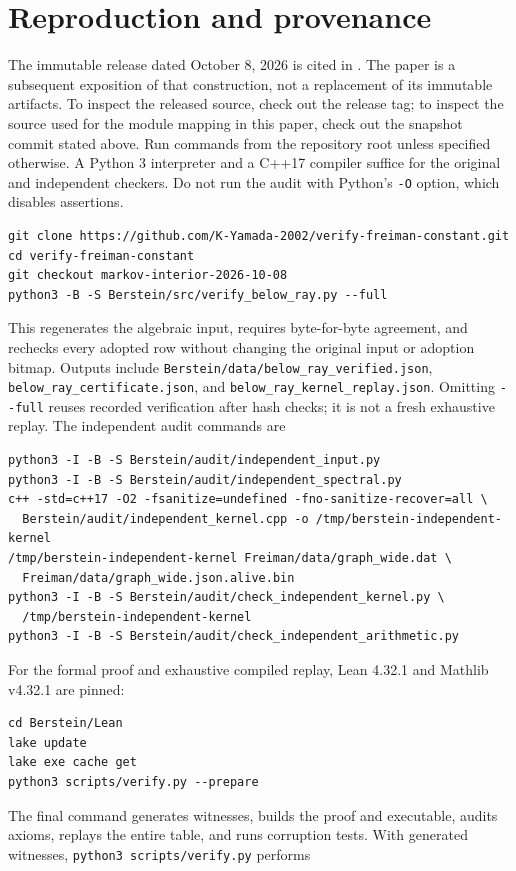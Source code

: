 \documentclass[11pt,a4paper]{article}
\newcommand{\file}[1]{{\normalfont\small\nolinkurl{#1}}}
\begin{document}
\section{Reproduction and provenance}
The immutable release dated October 8, 2026 is cited in \cite{release}.
The paper is a subsequent exposition of that construction, not a
replacement of its immutable artifacts. To inspect the released source,
check out the release tag; to inspect the source used for the module
mapping in this paper, check out the snapshot commit stated above.
Run commands from the repository root unless specified otherwise.
A Python 3 interpreter and a C++17 compiler suffice for the original
and independent checkers. Do not run the audit with Python's \file{-O}
option, which disables assertions.
\begin{verbatim}
git clone https://github.com/K-Yamada-2002/verify-freiman-constant.git
cd verify-freiman-constant
git checkout markov-interior-2026-10-08
python3 -B -S Berstein/src/verify_below_ray.py --full
\end{verbatim}
This regenerates the algebraic input, requires byte-for-byte agreement,
and rechecks every adopted row without changing the original input or
adoption bitmap. Outputs include
\file{Berstein/data/below_ray_verified.json},
\file{below_ray_certificate.json}, and
\file{below_ray_kernel_replay.json}. Omitting \file{--full} reuses recorded
verification after hash checks; it is not a fresh exhaustive replay.
The independent audit commands are
\begin{verbatim}
python3 -I -B -S Berstein/audit/independent_input.py
python3 -I -B -S Berstein/audit/independent_spectral.py
c++ -std=c++17 -O2 -fsanitize=undefined -fno-sanitize-recover=all \
  Berstein/audit/independent_kernel.cpp -o /tmp/berstein-independent-kernel
/tmp/berstein-independent-kernel Freiman/data/graph_wide.dat \
  Freiman/data/graph_wide.json.alive.bin
python3 -I -B -S Berstein/audit/check_independent_kernel.py \
  /tmp/berstein-independent-kernel
python3 -I -B -S Berstein/audit/check_independent_arithmetic.py
\end{verbatim}
For the formal proof and exhaustive compiled replay, Lean 4.32.1 and
Mathlib v4.32.1 are pinned:
\begin{verbatim}
cd Berstein/Lean
lake update
lake exe cache get
python3 scripts/verify.py --prepare
\end{verbatim}
The final command generates witnesses, builds the proof and executable,
audits axioms, replays the entire table, and runs corruption tests.
With generated witnesses, \file{python3 scripts/verify.py} performs
\end{document}
